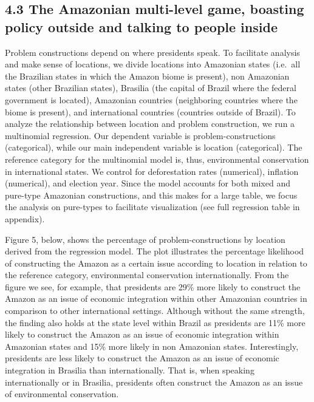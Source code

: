 \documentclass[
]{article}
\begin{document}
\hypertarget{the-amazonian-multi-level-game-boasting-policy-outside-and-talking-to-people-inside}{%
\subsection{4.3 The Amazonian multi-level game, boasting policy outside
and talking to people
inside}\label{the-amazonian-multi-level-game-boasting-policy-outside-and-talking-to-people-inside}}

Problem constructions depend on where presidents speak. To facilitate
analysis and make sense of locations, we divide locations into Amazonian
states (i.e.~all the Brazilian states in which the Amazon biome is
present), non Amazonian states (other Brazilian states), Brasilia (the
capital of Brazil where the federal government is located), Amazonian
countries (neighboring countries where the biome is present), and
international countries (countries outside of Brazil). To analyze the
relationship between location and problem construction, we run a
multinomial regression. Our dependent variable is problem-constructions
(categorical), while our main independent variable is location
(categorical). The reference category for the multinomial model is,
thus, environmental conservation in international states. We control for
deforestation rates (numerical), inflation (numerical), and election
year. Since the model accounts for both mixed and pure-type Amazonian
constructions, and this makes for a large table, we focus the analysis
on pure-types to facilitate visualization (see full regression table in
appendix).

Figure 5, below, shows the percentage of problem-constructions by
location derived from the regression model. The plot illustrates the
percentage likelihood of constructing the Amazon as a certain issue
according to location in relation to the reference category,
environmental conservation internationally. From the figure we see, for
example, that presidents are 29\% more likely to construct the Amazon as
an issue of economic integration within other Amazonian countries in
comparison to other international settings. Although without the same
strength, the finding also holds at the state level within Brazil as
presidents are 11\% more likely to construct the Amazon as an issue of
economic integration within Amazonian states and 15\% more likely in non
Amazonian states. Interestingly, presidents are less likely to construct
the Amazon as an issue of economic integration in Brasilia than
internationally. That is, when speaking internationally or in Brasilia,
presidents often construct the Amazon as an issue of environmental
conservation.
\end{document}
